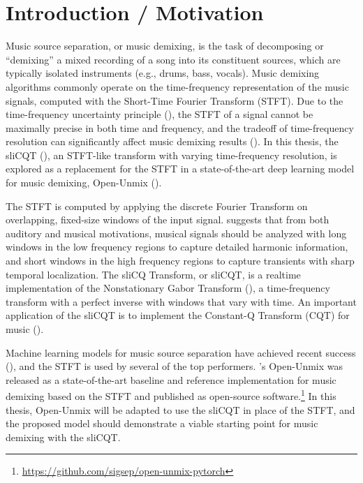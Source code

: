 \documentclass[letter,12pt]{article}
\title{\ThesisTitle}
\author{Sevag Hanssian, sevag.hanssian@mail.mcgill.ca}
\begin{document}
\maketitle

\section{Introduction / Motivation}

Music source separation, or music demixing, is the task of decomposing or ``demixing'' a mixed recording of a song into its constituent sources, which are typically isolated instruments (e.g., drums, bass, vocals). Music demixing algorithms commonly operate on the time-frequency representation of the music signals, computed with the Short-Time Fourier Transform (STFT). Due to the time-frequency uncertainty principle (\cite{gabor1946}), the STFT of a signal cannot be maximally precise in both time and frequency, and the tradeoff of time-frequency resolution can significantly affect music demixing results (\cite{tftradeoff1}). In this thesis, the sliCQT (\cite{slicq}), an STFT-like transform with varying time-frequency resolution, is explored as a replacement for the STFT in a state-of-the-art deep learning model for music demixing, Open-Unmix (\cite{umx}).

The STFT is computed by applying the discrete Fourier Transform on overlapping, fixed-size windows of the input signal. \textcite{doerflerphd} suggests that from both auditory and musical motivations, musical signals should be analyzed with long windows in the low frequency regions to capture detailed harmonic information, and short windows in the high frequency regions to capture transients with sharp temporal localization. The sliCQ Transform, or sliCQT, is a realtime implementation of the Nonstationary Gabor Transform (\cite{balazs}), a time-frequency transform with a perfect inverse with windows that vary with time. An important application of the sliCQT is to implement the Constant-Q Transform (CQT) for music (\cite{jbrown}).

Machine learning models for music source separation have achieved recent success (\cite{sisec2018}), and the STFT is used by several of the top performers. \textcite{umx}'s Open-Unmix was released as a state-of-the-art baseline and reference implementation for music demixing based on the STFT and published as open-source software.\footnote{\url{https://github.com/sigsep/open-unmix-pytorch}} In this thesis, Open-Unmix will be adapted to use the sliCQT in place of the STFT, and the proposed model should demonstrate a viable starting point for music demixing with the sliCQT.
\end{document}
